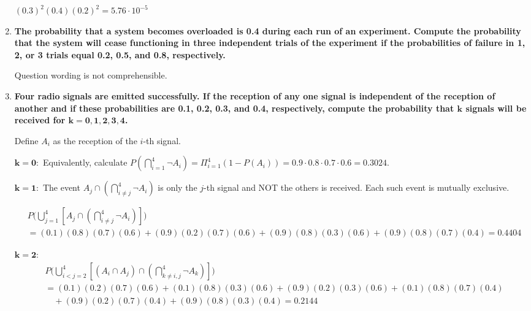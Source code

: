 \documentclass[10pt, oneside]{article}   	%
\theoremstyle{definition}
\begin{document}
\begin{enumerate}[label=3.\arabic*]
$(0.3)^2 (0.4) (0.2)^2 = \boxed{5.76 \cdot 10^{-5}}$

\item  \begin{tcolorbox}[
  colback=Cerulean!5!white,
  colframe=Cerulean!75!black]
\textbf{The probability that a system becomes overloaded is 0.4 during each run of an experiment. Compute the probability that the system will cease functioning in three independent trials of the experiment if the probabilities of failure in 1, 2, or 3 trials equal 0.2, 0.5, and 0.8, respectively.}
\end{tcolorbox}

Question wording is not comprehensible.

\item  \begin{tcolorbox}[
  colback=Cerulean!5!white,
  colframe=Cerulean!75!black]
\textbf{Four radio signals are emitted successfully. If the reception of any one signal is independent of the reception of another and if these probabilities are 0.1, 0.2, 0.3, and 0.4, respectively, compute the probability that $\bm{k}$ signals will be received for $\bm{k = 0, 1, 2, 3, 4}$.}
\end{tcolorbox}

Define $A_i$ as the reception of the $i$-th signal.

$\bm{k = 0}:$ Equivalently, calculate $P(\bigcap^4_{i=1} \neg A_i) = \Pi^4_{i = 1} (1 - P(A_i)) = 0.9 \cdot 0.8 \cdot 0.7 \cdot 0.6 = \boxed{0.3024}$.

$\bm{k = 1}:$ The event $A_j \cap ( \bigcap^4_{i \neq j} \neg A_i )$ is only the $j$-th signal and NOT the others is received. Each such event is mutually exclusive.

\begin{align*}
&P\Bigg( \bigcup^4_{j = 1} [ A_j \cap ( \bigcap^4_{i \neq j} \neg A_i ) ] \Bigg) \\
&= (0.1)(0.8)(0.7)(0.6) + (0.9)(0.2)(0.7)(0.6) + (0.9)(0.8)(0.3)(0.6) + (0.9)(0.8)(0.7)(0.4) = \boxed{0.4404}
\end{align*}

$\bm{k = 2}:$ 
\begin{align*}
&P\Bigg( \bigcup^4_{i < j = 2} [ (A_i \cap A_j) \cap ( \bigcap^4_{k \neq i, j} \neg A_k) ] \Bigg) \\
&= (0.1)(0.2)(0.7)(0.6) + (0.1)(0.8)(0.3)(0.6) + (0.9)(0.2)(0.3)(0.6) + (0.1)(0.8)(0.7)(0.4) \\
&\quad + (0.9)(0.2)(0.7)(0.4) + (0.9)(0.8)(0.3)(0.4) = \boxed{0.2144}
\end{align*}


\end{enumerate}
\end{document}
